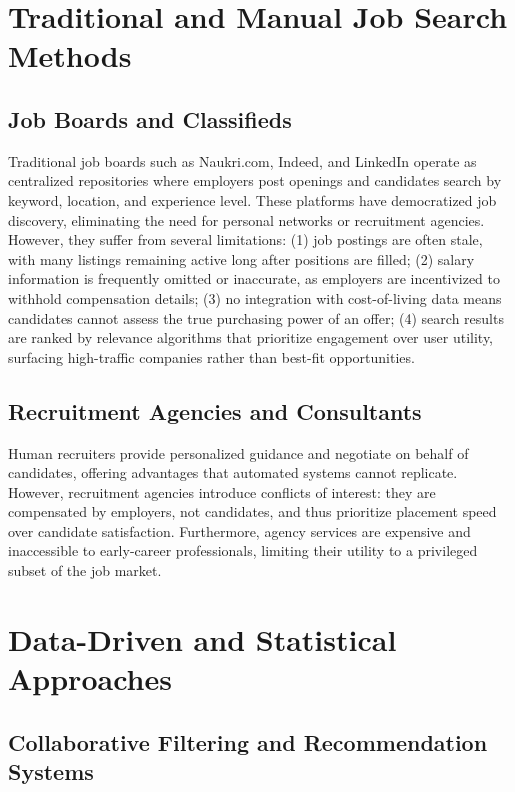 \section{Traditional and Manual Job Search Methods}

\subsection{Job Boards and Classifieds}

Traditional job boards such as Naukri.com, Indeed, and LinkedIn operate as centralized repositories where employers post openings and candidates search by keyword, location, and experience level. These platforms have democratized job discovery, eliminating the need for personal networks or recruitment agencies. However, they suffer from several limitations: (1) job postings are often stale, with many listings remaining active long after positions are filled; (2) salary information is frequently omitted or inaccurate, as employers are incentivized to withhold compensation details; (3) no integration with cost-of-living data means candidates cannot assess the true purchasing power of an offer; (4) search results are ranked by relevance algorithms that prioritize engagement over user utility, surfacing high-traffic companies rather than best-fit opportunities.

\subsection{Recruitment Agencies and Consultants}

Human recruiters provide personalized guidance and negotiate on behalf of candidates, offering advantages that automated systems cannot replicate. However, recruitment agencies introduce conflicts of interest: they are compensated by employers, not candidates, and thus prioritize placement speed over candidate satisfaction. Furthermore, agency services are expensive and inaccessible to early-career professionals, limiting their utility to a privileged subset of the job market.

\section{Data-Driven and Statistical Approaches}

\subsection{Collaborative Filtering and Recommendation Systems}

